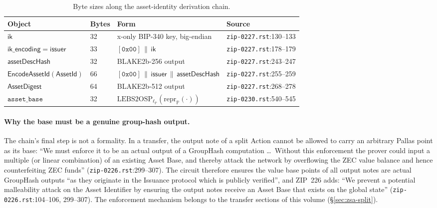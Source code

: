 \documentclass[11pt,a4paper]{article}
\theoremstyle{definition}
\newcommand{\PP}{\mathbb{P}}
\begin{document}
\begin{table}[ht]
\centering
\small
\begin{tabular}{@{}llll@{}}
\toprule
Object & Bytes & Form & Source \\
\midrule
$\mathsf{ik}$ & 32 & x-only BIP-340 key, big-endian &
  \texttt{zip-0227.rst}:130--133 \\
$\mathsf{ik\_encoding} = \mathsf{issuer}$ & 33 &
  $[\mathtt{0x00}] \,\|\, \mathsf{ik}$ &
  \texttt{zip-0227.rst}:178--179 \\
$\mathsf{assetDescHash}$ & 32 & BLAKE2b-256 output &
  \texttt{zip-0227.rst}:243--247 \\
$\mathsf{EncodeAssetId}(\mathsf{AssetId})$ & 66 &
  $[\mathtt{0x00}] \,\|\, \mathsf{issuer} \,\|\, \mathsf{assetDescHash}$ &
  \texttt{zip-0227.rst}:255--259 \\
$\mathsf{AssetDigest}$ & 64 & BLAKE2b-512 output &
  \texttt{zip-0227.rst}:268--278 \\
$\texttt{asset\_base}$ & 32 &
  $\mathrm{LEBS2OSP}_{\ell_{\PP}}(\mathrm{repr}_{\PP}(\cdot))$ &
  \texttt{zip-0230.rst}:540--545 \\
\bottomrule
\end{tabular}
\caption{Byte sizes along the asset-identity derivation chain.}
\label{tab:zsa-identity-sizes}
\end{table}

\paragraph{Why the base must be a genuine group-hash output.} The chain's
final step is not a formality. In a transfer, the output note of a split
Action cannot be allowed to carry an arbitrary Pallas point as its base:
``We must enforce it to be an actual output of a GroupHash computation
\dots\ Without this enforcement the prover could input a multiple (or
linear combination) of an existing Asset Base, and thereby attack the
network by overflowing the ZEC value balance and hence counterfeiting ZEC
funds'' (\texttt{zip-0226.rst}:299--307). The circuit therefore ensures
the value base points of all output notes are actual GroupHash outputs
``as they originate in the Issuance protocol which is publicly verified'',
and ZIP~226 adds: ``We prevent a potential malleability attack on the
Asset Identifier by ensuring the output notes receive an Asset Base that
exists on the global state'' (\texttt{zip-0226.rst}:104--106, 299--307).
The enforcement mechanism belongs to the transfer sections of this volume
(\S\ref{sec:zsa-split}).
\end{document}
